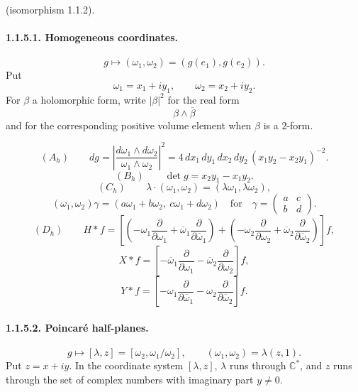\documentclass[10pt,a4paper]{article}
\providecommand{\C}{\mathbb C}
\begin{document}
\clearpage
{}
\hypertarget{authority-12}{}
\noindent(isomorphism 1.1.2).

\paragraph{1.1.5.1. Homogeneous coordinates.}
\[
g\longmapsto(\omega_1,\omega_2)=(g(e_1),g(e_2)).
\]
Put
\[
\omega_1=x_1+iy_1,\qquad \omega_2=x_2+iy_2.
\]
For \(\beta\) a holomorphic form, write \(|\beta|^2\) for the real form
\[
\beta\wedge\overline\beta
\]
and for the corresponding positive volume element when \(\beta\) is a \(2\)-form.

\[
(A_h)\qquad
dg=\left|\frac{d\omega_1\wedge d\omega_2}{\omega_1\wedge\omega_2}\right|^2
=
4\,dx_1\,dy_1\,dx_2\,dy_2\,(x_1y_2-x_2y_1)^{-2}.
\]
\[
(B_h)\qquad
\det g=x_2y_1-x_1y_2.
\]
\[
(C_h)\qquad
\lambda\cdot(\omega_1,\omega_2)=(\lambda\omega_1,\lambda\omega_2),
\]
\[
(\omega_1,\omega_2)\gamma=(a\omega_1+b\omega_2,\ c\omega_1+d\omega_2)
\quad\text{for}\quad
\gamma=\begin{pmatrix}a&c\\ b&d\end{pmatrix}.
\]
\[
(D_h)\qquad
H*f=\left[\left(-\omega_1\frac{\partial}{\partial\omega_1}
+\overline\omega_1\frac{\partial}{\partial\overline\omega_1}\right)
+\left(-\omega_2\frac{\partial}{\partial\omega_2}
+\overline\omega_2\frac{\partial}{\partial\overline\omega_2}\right)\right]f,
\]
\[
X*f=\left[-\overline\omega_1\frac{\partial}{\partial\omega_1}
-\overline\omega_2\frac{\partial}{\partial\omega_2}\right]f,
\]
\[
Y*f=\left[-\omega_1\frac{\partial}{\partial\overline\omega_1}
-\omega_2\frac{\partial}{\partial\overline\omega_2}\right]f.
\]

\paragraph{1.1.5.2. Poincaré half-planes.}
\[
g\longmapsto[\lambda,z]=[\omega_2,\omega_1/\omega_2],\qquad
(\omega_1,\omega_2)=\lambda(z,1).
\]
Put \(z=x+iy\). In the coordinate system \([\lambda,z]\), \(\lambda\) runs through \(\C^*\), and \(z\) runs through the set of complex numbers with imaginary part \(y\ne0\).
\end{document}
